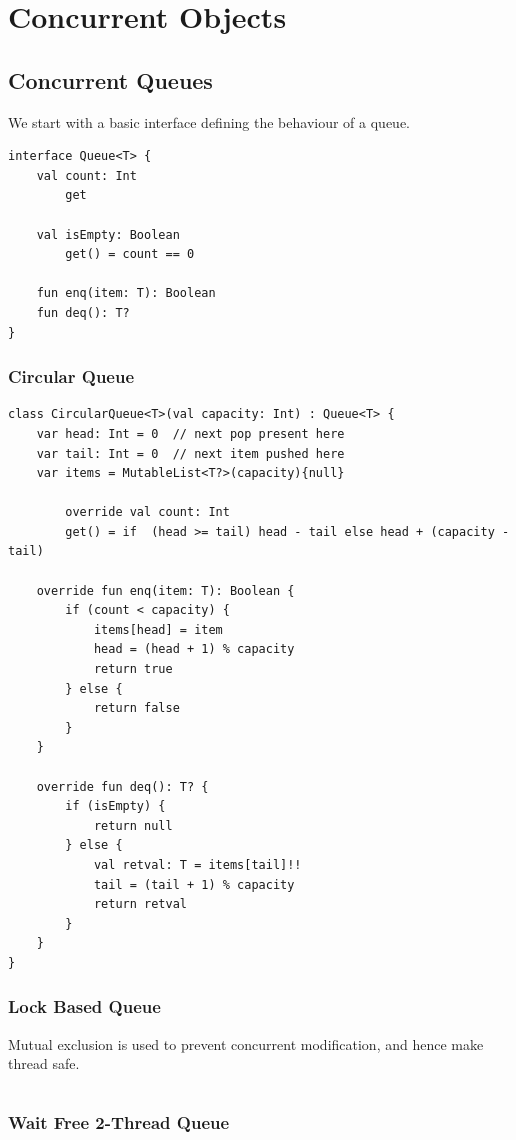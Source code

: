 \chapter{Concurrent Objects}

\section{Concurrent Queues}
We start with a basic interface defining the behaviour of a queue.
\begin{verbatim}
interface Queue<T> {
    val count: Int
        get
    
    val isEmpty: Boolean
        get() = count == 0

    fun enq(item: T): Boolean
    fun deq(): T?
} 
\end{verbatim}

\subsection{Circular Queue}
\begin{verbatim}
class CircularQueue<T>(val capacity: Int) : Queue<T> {
    var head: Int = 0  // next pop present here
    var tail: Int = 0  // next item pushed here
    var items = MutableList<T?>(capacity){null}
    
        override val count: Int
        get() = if  (head >= tail) head - tail else head + (capacity - tail)
    
    override fun enq(item: T): Boolean {
        if (count < capacity) {
            items[head] = item    
            head = (head + 1) % capacity
            return true
        } else {
            return false
        }
    }
    
    override fun deq(): T? {
        if (isEmpty) {
            return null
        } else {
            val retval: T = items[tail]!!
            tail = (tail + 1) % capacity
            return retval
        }
    }
}
\end{verbatim}

\subsection{Lock Based Queue}
Mutual exclusion is used to prevent concurrent modification, and hence make thread safe.
\begin{verbatim}

\end{verbatim}

\subsection{Wait Free 2-Thread Queue}


